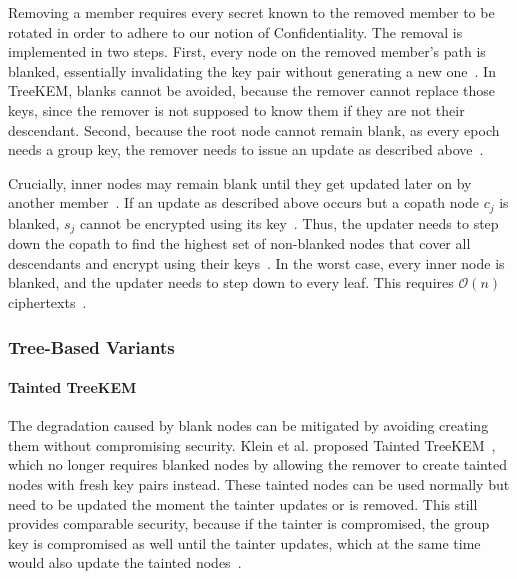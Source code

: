 \documentclass[conference]{IEEEtran}
\begin{document}
Removing a member requires every secret known to the removed member to be rotated in order to adhere to our notion of Confidentiality.
The removal is implemented in two steps. First, every node on the removed member's path is blanked, essentially invalidating the key pair without generating a new one~\cite{barnesMessagingLayerSecurity2023}.
In TreeKEM, blanks cannot be avoided, because the remover cannot replace those keys, since the remover is not supposed to know them if they are not their descendant.
Second, because the root node cannot remain blank, as every epoch needs a group key, the remover needs to issue an update as described above~\cite{barnesMessagingLayerSecurity2023}.

Crucially, inner nodes may remain blank until they get updated later on by another member~\cite{solerAnalysisEfficiencyMessaging2025}.
If an update as described above occurs but a copath node $c_j$ is blanked, $s_j$ cannot be encrypted using its key~\cite{barnesMessagingLayerSecurity2023}.
Thus, the updater needs to step down the copath to find the highest set of non-blanked nodes that cover all descendants and encrypt using their keys~\cite{barnesMessagingLayerSecurity2023}.
In the worst case, every inner node is blanked, and the updater needs to step down to every leaf.
This requires $\mathcal{O}(n)$ ciphertexts~\cite{solerAnalysisEfficiencyMessaging2025}.

\subsubsection{Tree-Based Variants}
\paragraph{Tainted TreeKEM}
The degradation caused by blank nodes can be mitigated by avoiding creating them without compromising security.
Klein et al. proposed Tainted TreeKEM~\cite{kleinKeepDirtTainted2021}, which no longer requires blanked nodes by allowing the remover to create tainted nodes with fresh key pairs instead.
These tainted nodes can be used normally but need to be updated the moment the tainter updates or is removed.
This still provides comparable security, because if the tainter is compromised, the group key is compromised as well until the tainter updates, which at the same time would also update the tainted nodes~\cite{kleinKeepDirtTainted2021}.
\end{document}

